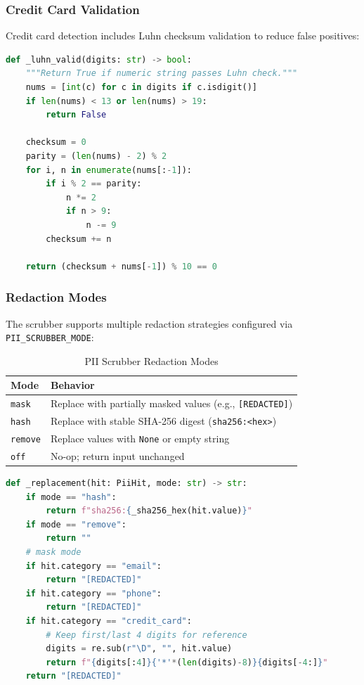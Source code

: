\subsubsection{Credit Card Validation}

Credit card detection includes Luhn checksum validation to reduce false positives:

\begin{lstlisting}[language=Python,caption={Luhn algorithm for credit card validation}]
def _luhn_valid(digits: str) -> bool:
    """Return True if numeric string passes Luhn check."""
    nums = [int(c) for c in digits if c.isdigit()]
    if len(nums) < 13 or len(nums) > 19:
        return False
    
    checksum = 0
    parity = (len(nums) - 2) % 2
    for i, n in enumerate(nums[:-1]):
        if i % 2 == parity:
            n *= 2
            if n > 9:
                n -= 9
        checksum += n
    
    return (checksum + nums[-1]) % 10 == 0
\end{lstlisting}

\subsubsection{Redaction Modes}

The scrubber supports multiple redaction strategies configured via \texttt{PII\_SCRUBBER\_MODE}:

\begin{table}[ht]
\centering
\caption{PII Scrubber Redaction Modes}
\label{tab:pii-modes}
\begin{tabular}{lp{8cm}}
\hline
\textbf{Mode} & \textbf{Behavior} \\
\hline
\texttt{mask} & Replace with partially masked values (e.g., \texttt{[REDACTED]}) \\
\texttt{hash} & Replace with stable SHA-256 digest (\texttt{sha256:<hex>}) \\
\texttt{remove} & Replace values with \texttt{None} or empty string \\
\texttt{off} & No-op; return input unchanged \\
\hline
\end{tabular}
\end{table}

\begin{lstlisting}[language=Python,caption={PII redaction with mode selection}]
def _replacement(hit: PiiHit, mode: str) -> str:
    if mode == "hash":
        return f"sha256:{_sha256_hex(hit.value)}"
    if mode == "remove":
        return ""
    # mask mode
    if hit.category == "email":
        return "[REDACTED]"
    if hit.category == "phone":
        return "[REDACTED]"
    if hit.category == "credit_card":
        # Keep first/last 4 digits for reference
        digits = re.sub(r"\D", "", hit.value)
        return f"{digits[:4]}{'*'*(len(digits)-8)}{digits[-4:]}"
    return "[REDACTED]"
\end{lstlisting}

